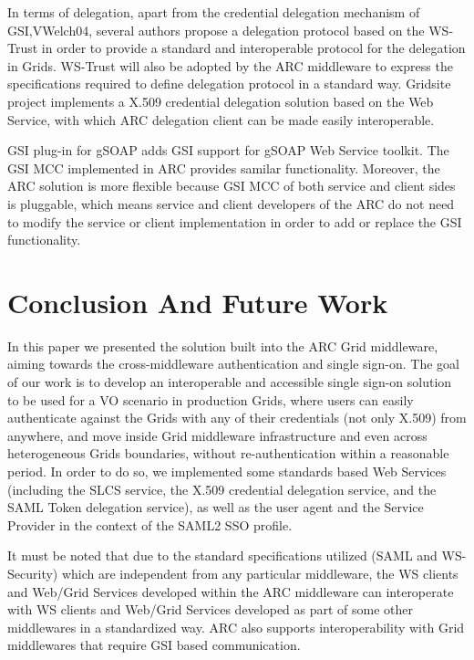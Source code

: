 In terms of delegation, apart from the credential delegation mechanism of GSI\cite{IFoster98},{VWelch04}, several authors\cite{MAhsant04} propose a delegation protocol based on the WS-Trust\cite{WSTrustlink} in order to provide a standard and interoperable protocol for the delegation in Grids. WS-Trust will also be adopted by the ARC middleware to express the specifications required to define delegation protocol in a standard way. Gridsite project implements a X.509 credential delegation solution\cite{GridSitelink} based on the Web Service, with which ARC delegation client can be made easily interoperable.

GSI plug-in for gSOAP\cite{GAloisio05} adds GSI support for gSOAP Web Service toolkit. The GSI MCC implemented in ARC provides samilar functionality. Moreover, the ARC solution is more flexible because GSI MCC of both service and client sides is pluggable, which means service and client developers of the ARC do not need to modify the service or client implementation in order to add or replace the GSI functionality.



\section{Conclusion And Future Work}
\label{sec:conclusion}
In this paper we presented the solution built into the ARC Grid middleware, aiming towards the cross-middleware authentication and single sign-on. The goal of our work is to develop an interoperable and accessible single sign-on solution to be used for a VO scenario in production Grids, where users can easily authenticate against the Grids with any of their credentials (not only X.509) from anywhere, and move inside Grid middleware infrastructure and even across heterogeneous Grids  boundaries, without re-authentication within a reasonable period. In order to do so, we implemented some standards based Web Services (including the SLCS service, the X.509 credential delegation service, and the SAML Token delegation service), as well as the user agent and the Service Provider in the context of the SAML2 SSO profile.

It must be noted that due to the standard specifications utilized (SAML and WS-Security) which are independent from any particular middleware, the WS clients and Web/Grid Services developed within the ARC middleware can interoperate with WS clients and Web/Grid Services developed as part of some other middlewares in a standardized way. ARC also supports interoperability with Grid middlewares that require GSI based communication.

